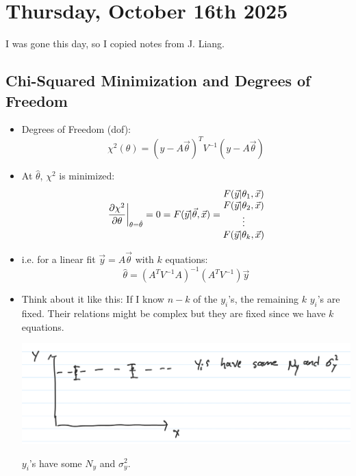 \section{Thursday, October 16th 2025}

I was gone this day, so I copied notes from J. Liang.

\subsection{Chi-Squared Minimization and Degrees of Freedom}

\begin{itemize}
      \item Degrees of Freedom (dof):
            \[
                  \chi^2(\theta) = (y - A \vec{\theta})^T V^{-1} (y - A \vec{\theta})
            \]
      \item At $\hat{\theta}$, $\chi^2$ is minimized:
            \[
                  \pdv{\chi^2}{\theta}\bigg|_{\theta = \hat{\theta}} = 0 =
                  F(\vec{y} | \vec{\theta}, \vec{x}) =
                  \begin{matrix}
                        F(\vec{y} | \theta_1, \vec{x}) \\
                        F(\vec{y} | \theta_2, \vec{x}) \\
                        \vdots                         \\
                        F(\vec{y} | \theta_k, \vec{x})
                  \end{matrix}
            \]
      \item i.e. for a linear fit $\vec{y} = A \vec{\theta}$ with $k$ equations:
            \[
                  \hat{\theta} = (A^T V^{-1} A)^{-1} (A^T V^{-1}) \vec{y}
            \]
      \item Think about it like this: If I know $n-k$ of the $y_i$'s, the remaining $k$ $y_i$'s are fixed. Their relations might be complex but they are fixed since we have $k$ equations.

            \includegraphics[width=0.8\linewidth]{Images/lec11-chisqu-example.png}

            $y_i$'s have some $N_y$ and $\sigma_y^2$.
\end{itemize}

